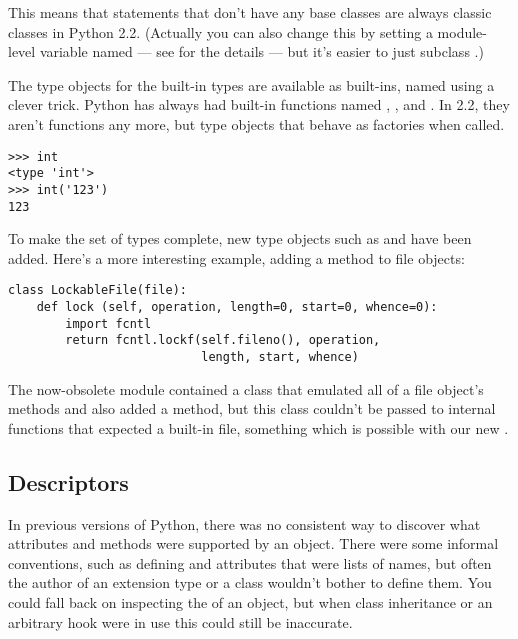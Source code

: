 \documentclass{howto}
\begin{document}
This means that  statements that don't have any base
classes are always classic classes in Python 2.2.  (Actually you can
also change this by setting a module-level variable named
 --- see  for the details --- but it's
easier to just subclass .)

The type objects for the built-in types are available as built-ins,
named using a clever trick.  Python has always had built-in functions
named , , and .  In
2.2, they aren't functions any more, but type objects that behave as
factories when called.

\begin{verbatim}
>>> int
<type 'int'>
>>> int('123')
123
\end{verbatim}

To make the set of types complete, new type objects such as
 and  have been added.  Here's a
more interesting example, adding a  method to file
objects:

\begin{verbatim}
class LockableFile(file):
    def lock (self, operation, length=0, start=0, whence=0):
        import fcntl
        return fcntl.lockf(self.fileno(), operation,
                           length, start, whence)
\end{verbatim}

The now-obsolete  module contained a class that
emulated all of a file object's methods and also added a
 method, but this class couldn't be passed to internal
functions that expected a built-in file, something which is possible
with our new .


\subsection{Descriptors}

In previous versions of Python, there was no consistent way to
discover what attributes and methods were supported by an object.
There were some informal conventions, such as defining
 and  attributes that were
lists of names, but often the author of an extension type or a class
wouldn't bother to define them.  You could fall back on inspecting the
 of an object, but when class inheritance or an
arbitrary  hook were in use this could still be
inaccurate.
\end{document}
